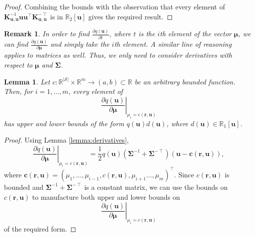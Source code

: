 \documentclass{mpaper}
\newtheorem{lemma}[theorem]{Lemma}
\newtheorem{remark}[theorem]{Remark}
\newcommand{\Kuu}{\mathbf{K}_{\mathbf{u},\mathbf{u}}}
\begin{document}
\begin{proof}
  Combining the bounds with the observation that
  every element of
  $\Kuu^{-1}\mathbf{u}\mathbf{u}^\intercal\Kuu^{-\intercal}$ is in
  $\mathbb{R}_2[\mathbf{u}]$ gives the required result.
\end{proof}

\begin{remark}
  In order to find $\frac{\partial q(\mathbf{u})}{\partial t}$,
  where $t$ is the $i$th element of the vector $\bm\mu$, we can
  find $\frac{\partial q(\mathbf{u})}{\partial \bm\mu}$ and simply take the
  $i$th element. A similar line of reasoning applies to matrices as well. Thus,
  we only need to consider derivatives with respect to $\bm\mu$ and
  $\bm\Sigma$.
\end{remark}

\begin{lemma} \label{lemma:bound2}
  Let $c : \mathbb{R}^{|\mathcal{S}|} \times \mathbb{R}^m \to (a, b) \subset
  \mathbb{R}$ be an arbitrary bounded function. Then, for $i = 1, \dots, m$,
  every element of
  \[
    \left. \frac{\partial q(\mathbf{u})}{\partial \bm\mu} \right|_{\mu_i =
      c(\mathbf{r}, \mathbf{u})}
  \]
  has upper and lower bounds of the form $q(\mathbf{u})d(\mathbf{u})$,
  where $d(\mathbf{u}) \in \mathbb{R}_1[\mathbf{u}]$.
\end{lemma}
\begin{proof}
  Using Lemma \ref{lemma:derivatives},
  \[
    \left. \frac{\partial q(\mathbf{u})}{\partial \bm\mu} \right|_{\mu_i =
      c(\mathbf{r}, \mathbf{u})} = \frac{1}{2}q(\mathbf{u})(\bm\Sigma^{-1} +
    \bm\Sigma^{-\intercal})(\mathbf{u} - \mathbf{c}(\mathbf{r}, \mathbf{u})),
  \]
  where $\mathbf{c}(\mathbf{r}, \mathbf{u}) = (\mu_1, \dots, \mu_{i - 1},
  c(\mathbf{r}, \mathbf{u}), \mu_{i + 1} \dots, \mu_m)^\intercal$. Since
  $c(\mathbf{r}, \mathbf{u})$ is bounded and $\bm\Sigma^{-1} +
  \bm\Sigma^{-\intercal}$ is a constant matrix, we can use the bounds on
  $c(\mathbf{r}, \mathbf{u})$ to manufacture both upper and lower bounds on
  \[
     \left. \frac{\partial q(\mathbf{u})}{\partial \bm\mu} \right|_{\mu_i =
      c(\mathbf{r}, \mathbf{u})}
  \]
  of the required form.
\end{proof}
\end{document}
